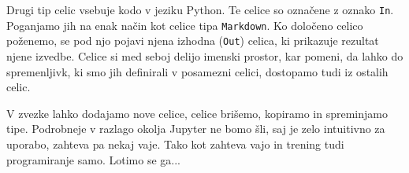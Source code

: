 Drugi tip celic vsebuje kodo v jeziku Python. Te celice so označene z oznako \texttt{In}. Poganjamo jih na enak način kot celice tipa \texttt{Markdown}. Ko določeno celico poženemo, se pod njo pojavi njena izhodna (\texttt{Out}) celica, ki prikazuje rezultat njene izvedbe. Celice si med seboj delijo imenski prostor, kar pomeni, da lahko do spremenljivk, ki smo jih definirali v posamezni celici, dostopamo tudi iz ostalih celic. 

V zvezke lahko dodajamo nove celice, celice brišemo, kopiramo in spreminjamo tipe. Podrobneje v razlago okolja Jupyter ne bomo šli, saj je zelo intuitivno za uporabo, zahteva pa nekaj vaje. Tako kot zahteva vajo in trening tudi programiranje samo. Lotimo se ga...


